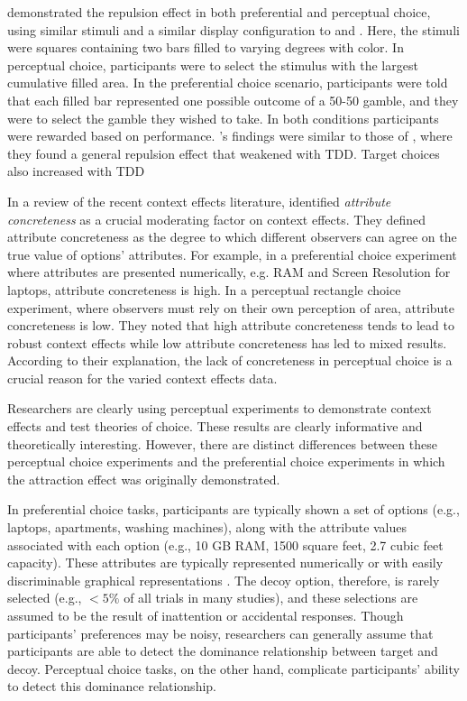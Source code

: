 \textcite{spektorRepulsionEffectPreferential2022} demonstrated the repulsion effect in both preferential and perceptual choice, using similar stimuli and a similar display configuration to \textcite{spektorWhenGoodLooks2018b} and \textcite{liaoInfluenceDistanceDecoy2021}. Here, the stimuli were squares containing two bars filled to varying degrees with color. In perceptual choice, participants were to select the stimulus with the largest cumulative filled area. In the preferential choice scenario, participants were told that each filled bar represented one possible outcome of a 50-50 gamble, and they were to select the gamble they wished to take. In both conditions participants were rewarded based on performance. \textcite{spektorRepulsionEffectPreferential2022}'s findings were similar to those of \textcite{spektorWhenGoodLooks2018b}, where they found a general repulsion effect that weakened with TDD. Target choices also increased with TDD

In a review of the recent context effects literature, \textcite{spektorElusivenessContextEffects2021} identified \textit{attribute concreteness} as a crucial moderating factor on context effects. They defined attribute concreteness as the degree to which different observers can agree on the true value of options' attributes. For example, in a preferential choice experiment where attributes are presented numerically, e.g. RAM and Screen Resolution for laptops, attribute concreteness is high. In a perceptual rectangle choice experiment, where observers must rely on their own perception of area, attribute concreteness is low. They noted that high attribute concreteness tends to lead to robust context effects while low attribute concreteness has led to mixed results. According to their explanation, the lack of concreteness in perceptual choice is a crucial reason for the varied context effects data. 

Researchers are clearly using perceptual experiments to demonstrate context effects and test theories of choice. These results are clearly informative and theoretically interesting. However, there are distinct differences between these perceptual choice experiments and the preferential choice experiments in which the attraction effect was originally demonstrated. 

In preferential choice tasks, participants are typically shown a set of options (e.g., laptops, apartments, washing machines), along with the attribute values associated with each option (e.g., 10 GB RAM, 1500 square feet, 2.7 cubic feet capacity). These attributes are typically represented numerically \parencite{hayes2024attribute,banerjeeFactorsThatPromote2024} or with easily discriminable graphical representations \parencite{cataldoComparisonProcessAccount2019b}. The decoy option, therefore, is rarely selected (e.g., $<5\%$ of all trials in many studies), and these selections are assumed to be the result of inattention or accidental responses. Though participants' preferences may be noisy, researchers can generally assume that participants are able to detect the dominance relationship between target and decoy. Perceptual choice tasks, on the other hand, complicate participants' ability to detect this dominance relationship.

